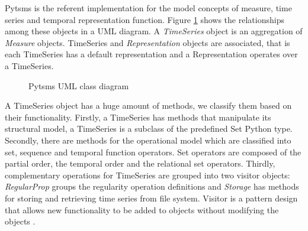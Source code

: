 Pytsms is the referent implementation for the model concepts of
measure, time series and temporal representation function.  Figure
\ref{fig:implementacio:pytsms-uml} shows the relationships among these
objects in a UML diagram. A \emph{TimeSeries} object is an aggregation
of \emph{Measure} objects. TimeSeries and \emph{Representation}
objects are associated, that is each TimeSeries has a default
representation and a Representation operates over a TimeSeries.

\begin{figure}[tp]
  \centering



  \caption{Pytsms UML class diagram}
  \label{fig:implementacio:pytsms-uml}
\end{figure}




A TimeSeries object has a huge amount of methods, we classify them
based on their functionality. Firstly, a TimeSeries has methods that
manipulate its structural model, a TimeSeries is a subclass of the
predefined Set Python type. Secondly, there are methods for the
operational model which are classified into set, sequence and temporal
function operators.  Set operators are composed of the partial order,
the temporal order and the relational set operators.  Thirdly,
complementary operations for TimeSeries are grouped into two visitor
objects: \emph{RegularProp} groups the regularity operation
definitions and \emph{Storage} has methods for storing and retrieving
time series from file system. Visitor is a pattern design that allows
new functionality to be added to objects without modifying the
objects \cite{ziade08:expert_python_programming:visitor,martin02:visitor}.


